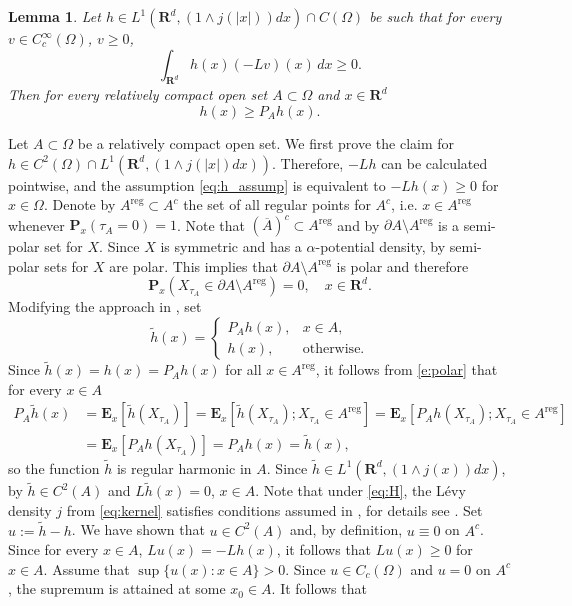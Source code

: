 \documentclass[a4paper,12pt,draft]{article}
\theoremstyle{plain}
\newtheorem{lemma}[thm]{Lemma}
\theoremstyle{definition}
\numberwithin{equation}{section}
\newcommand\R{\mathbf{R}}
\renewcommand{\ge}{\geqslant}
\newcommand{\1}{1}
\begin{document}
\begin{lemma}\label{l:superharmonic}
Let $h\in L^1(\R^d, (1\wedge j(|x|))dx)\cap C(\Omega)$ be such that for every $v\in C_c^\infty(\Omega)$, $v\ge 0$,
\begin{equation}\label{eq:h_assump}
\int_{\R^d} h(x) (-L v)(x)\, dx  \ge 0.
\end{equation}
Then for every relatively compact open set $A\subset \Omega$ and $x\in\R^d$
\[
h(x) \ge P_A h(x). 
\]
\end{lemma}

\proof Let $A\subset \Omega$ be a relatively compact open set. We first prove the claim for $h\in C^2(\Omega)\cap L^1(\R^d, (1\wedge j(|x|)dx))$. Therefore, $-Lh$ can be calculated pointwise, and the assumption \eqref{eq:h_assump} is equivalent to $-Lh(x)\ge 0$ for $x\in\Omega$.
Denote by $A^{\text{reg}}\subset A^c$ the set of all regular points for $A^c$, i.e. $x\in A^{\text{reg}}$ whenever $\mathbf P_x (\tau_A=0)=1$. Note that $(\overline{A})^c\subset A^{\text{reg}}$ and by \cite[Proposition II (3.3), p.80]{BG} $\partial A\setminus A^{\text{reg}}$ is a semi-polar set for $X$.  Since $X$ is symmetric and has a $\alpha$-potential density, by \cite[Proposition VI.4.10]{BG} semi-polar sets for $X$ are polar.  This implies that $\partial A\setminus A^{\text{reg}}$ is polar and therefore 
\begin{equation}\label{e:polar}
\mathbf P_x(X_{\tau_A}\in \partial A\setminus A^{\text{reg}})=0,\quad x\in\R^d.
\end{equation}
Modifying the approach in \cite[Lemma 3.2]{GKL}, set 
\begin{equation*}
\widetilde h(x)=\begin{cases}
P_{A}h(x), & x\in A,\\
h(x), & \text{otherwise}.
\end{cases}
\end{equation*}
Since $\widetilde h(x)=h(x)=P_A h(x)$ for all $x\in A^{\text{reg}}$, it follows from \eqref{e:polar} that for every $x\in A$
\begin{align*}
P_A \widetilde{h}(x)&=\mathbf E_x[\widetilde h(X_{\tau_A})]=\mathbf E_x[\widetilde h(X_{\tau_A});X_{\tau_A}\in A^{\text{reg}}]=\mathbf E_x[P_Ah(X_{\tau_A});X_{\tau_A}\in A^{\text{reg}}]\\
&=\mathbf E_x[P_Ah(X_{\tau_A})]=P_A h(x)=\widetilde h (x),
\end{align*}
so the function $\widetilde h$ is regular harmonic in $A$. Since 
$\widetilde h\in  L^1(\R^d,(1\wedge j(x))dx)$, by \cite[Lemma 2.2, Lemma 3.1]{GKL} $\widetilde h\in C^2(A)$ and $L \widetilde h(x)=0$, $x\in A$. Note that under \eqref{eq:H}, the L\' evy density $j$ from \eqref{eq:kernel} satisfies conditions \cite[(A), (1.2)]{GKL} assumed in \cite[Lemma 2.2]{GKL}, for details see \cite[Example 6.2]{GKL}. Set $u:=\widetilde h-h$. We have shown that $u\in C^2(A)$ and, by definition, $u\equiv 0$ on $A^c$. Since for every $x\in A$, $L u(x)=-L h(x)$, it follows that $Lu(x) \ge 0$ for $x\in A$. Assume that $\sup\{u(x):x\in A\}>0$. Since $u\in C_c(\Omega)$ and $u=0$ on $A^c$, the supremum is attained at some $x_0\in A$. It follows that
\end{document}
